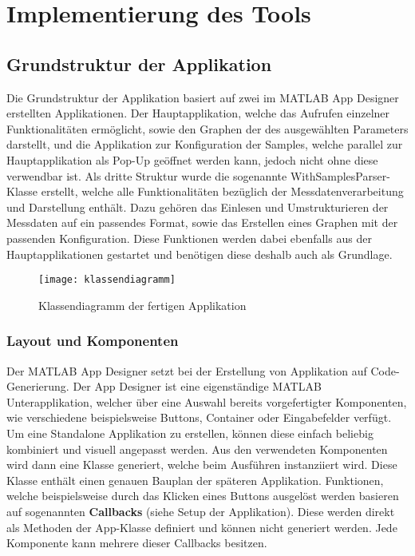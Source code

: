 
\chapter{Implementierung des Tools}

\section{Grundstruktur der Applikation}

Die Grundstruktur der Applikation basiert auf zwei im MATLAB App Designer erstellten Applikationen. Der Hauptapplikation, welche das Aufrufen einzelner Funktionalitäten ermöglicht, sowie den Graphen der des ausgewählten Parameters darstellt, und die Applikation zur Konfiguration der Samples, welche parallel zur Hauptapplikation als Pop-Up geöffnet werden kann, jedoch nicht ohne diese verwendbar ist. Als dritte Struktur wurde die sogenannte WithSamplesParser-Klasse erstellt, welche alle Funktionalitäten bezüglich der Messdatenverarbeitung und Darstellung enthält. Dazu gehören das Einlesen und Umstrukturieren der Messdaten auf ein passendes Format, sowie das Erstellen eines Graphen mit der passenden Konfiguration. Diese Funktionen werden dabei ebenfalls aus der Hauptapplikationen gestartet und benötigen diese deshalb auch als Grundlage.

\begin{figure}[H]
	\centering
	\texttt{[image: klassendiagramm]}
	\caption{Klassendiagramm der fertigen Applikation}
	\label{fig:klassendiagramm}
\end{figure}

\subsection{Layout und Komponenten}

Der MATLAB App Designer setzt bei der Erstellung von Applikation auf Code-Generierung. Der App Designer ist eine eigenständige MATLAB Unterapplikation, welcher über eine Auswahl bereits vorgefertigter Komponenten, wie verschiedene beispielsweise Buttons, Container oder Eingabefelder verfügt. Um eine Standalone Applikation zu erstellen, können diese einfach beliebig kombiniert und visuell angepasst werden. Aus den verwendeten Komponenten wird dann eine Klasse generiert, welche beim Ausführen instanziiert wird. Diese Klasse enthält einen genauen \glqq Bauplan\grqq{} der späteren Applikation. Funktionen, welche beispielsweise durch das Klicken eines Buttons ausgelöst werden basieren auf sogenannten \textbf{Callbacks} (siehe Setup der Applikation). Diese werden direkt als Methoden der App-Klasse definiert und können nicht generiert werden. Jede Komponente kann mehrere dieser Callbacks besitzen.

